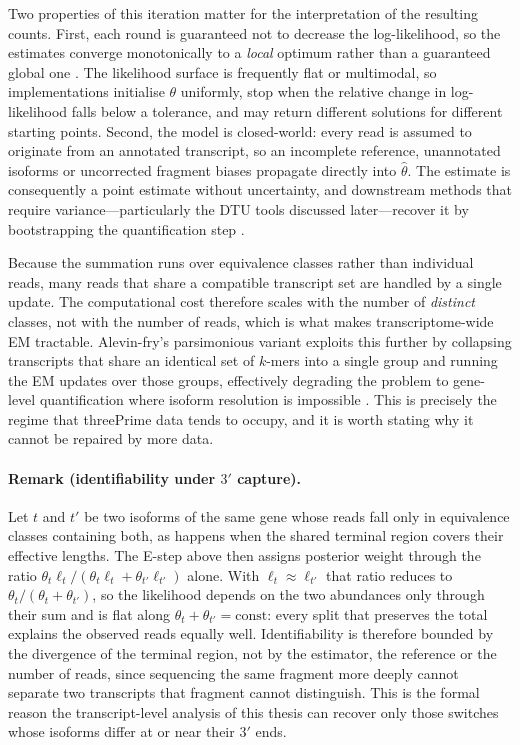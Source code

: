Two properties of this iteration matter for the interpretation of the resulting counts. First, each round is guaranteed not to decrease the log-likelihood, so the estimates converge monotonically to a \emph{local} optimum rather than a guaranteed global one \cite{dempster1977maximum}. The likelihood surface is frequently flat or multimodal, so implementations initialise $\theta$ uniformly, stop when the relative change in log-likelihood falls below a tolerance, and may return different solutions for different starting points. Second, the model is closed-world: every read is assumed to originate from an annotated transcript, so an incomplete reference, unannotated isoforms or uncorrected fragment biases propagate directly into $\hat{\theta}$. The estimate is consequently a point estimate without uncertainty, and downstream methods that require variance---particularly the DTU tools discussed later---recover it by bootstrapping the quantification step \cite{love2018swimming}.

Because the summation runs over equivalence classes rather than individual reads, many reads that share a compatible transcript set are handled by a single update. The computational cost therefore scales with the number of \emph{distinct} classes, not with the number of reads, which is what makes transcriptome-wide EM tractable. Alevin-fry's parsimonious variant exploits this further by collapsing transcripts that share an identical set of $k$-mers into a single group and running the EM updates over those groups, effectively degrading the problem to gene-level quantification where isoform resolution is impossible \cite{he2022alevin}. This is precisely the regime that \gls{threePrime} data tends to occupy, and it is worth stating why it cannot be repaired by more data.

\paragraph{Remark (identifiability under $3'$ capture).}
Let $t$ and $t'$ be two isoforms of the same gene whose reads fall only in equivalence classes containing both, as happens when the shared terminal region covers their effective lengths. The E-step above then assigns posterior weight through the ratio $\theta_t \ell_t / (\theta_t \ell_t + \theta_{t'} \ell_{t'})$ alone. With $\ell_t \approx \ell_{t'}$ that ratio reduces to $\theta_t / (\theta_t + \theta_{t'})$, so the likelihood depends on the two abundances only through their sum and is flat along $\theta_t + \theta_{t'} = \text{const}$: every split that preserves the total explains the observed reads equally well. Identifiability is therefore bounded by the divergence of the terminal region, not by the estimator, the reference or the number of reads, since sequencing the same fragment more deeply cannot separate two transcripts that fragment cannot distinguish. This is the formal reason the transcript-level analysis of this thesis can recover only those switches whose isoforms differ at or near their $3'$ ends.

